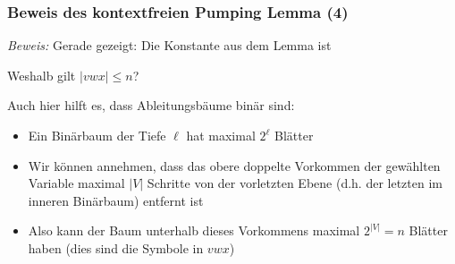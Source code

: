 \documentclass[aspectratio=1610,onlymath]{beamer}
\begin{document}
\begin{frame}[t]\frametitle{Beweis des kontextfreien Pumping Lemma (4)}

\vspace{-1ex}
\medskip

\emph{Beweis:} %
% 
Gerade gezeigt: Die Konstante aus dem Lemma ist 
\medskip

\alert{Weshalb gilt $|vwx|\leq n$?}\pause\medskip

Auch hier hilft es, dass Ableitungsbäume binär sind:
\begin{itemize}
\item Ein Binärbaum der Tiefe $\ell$ hat maximal $2^\ell$ Blätter\pause
\item Wir können annehmen, dass das obere doppelte Vorkommen der gewählten Variable maximal
$|V|$ Schritte von der vorletzten Ebene (d.h. der letzten im inneren Binärbaum) entfernt ist\pause
\item Also kann der Baum unterhalb dieses Vorkommens maximal $2^{|V|}=n$ Blätter haben (dies sind die Symbole in $vwx$)
\end{itemize}

\end{frame}
\end{document}
